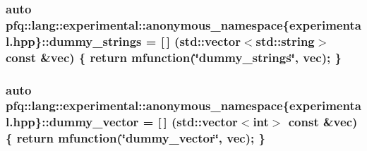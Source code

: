 \hypertarget{namespacepfq_1_1lang_1_1experimental_1_1anonymous__namespace_02experimental_8hpp_03_af6c041f2494f9dd06acb73d42524e3ad}{
\subsubsection[{dummy\+\_\+strings}]{\setlength{\rightskip}{0pt plus 5cm}auto pfq\+::lang\+::experimental\+::anonymous\+\_\+namespace\{experimental.\+hpp\}\+::dummy\+\_\+strings = \mbox{[}$\,$\mbox{]} (std\+::vector$<$std\+::string$>$ const \&vec) \{ return {\bf mfunction}(\char`\"{}dummy\+\_\+strings\char`\"{}, vec); \}}}\label{namespacepfq_1_1lang_1_1experimental_1_1anonymous__namespace_02experimental_8hpp_03_af6c041f2494f9dd06acb73d42524e3ad}
\hypertarget{namespacepfq_1_1lang_1_1experimental_1_1anonymous__namespace_02experimental_8hpp_03_a8ee61246090fb5d74e96dbb7f19b7008}{
\subsubsection[{dummy\+\_\+vector}]{\setlength{\rightskip}{0pt plus 5cm}auto pfq\+::lang\+::experimental\+::anonymous\+\_\+namespace\{experimental.\+hpp\}\+::dummy\+\_\+vector = \mbox{[}$\,$\mbox{]} (std\+::vector$<$int$>$ const \&vec) \{ return {\bf mfunction}(\char`\"{}dummy\+\_\+vector\char`\"{}, vec); \}}}\label{namespacepfq_1_1lang_1_1experimental_1_1anonymous__namespace_02experimental_8hpp_03_a8ee61246090fb5d74e96dbb7f19b7008}
